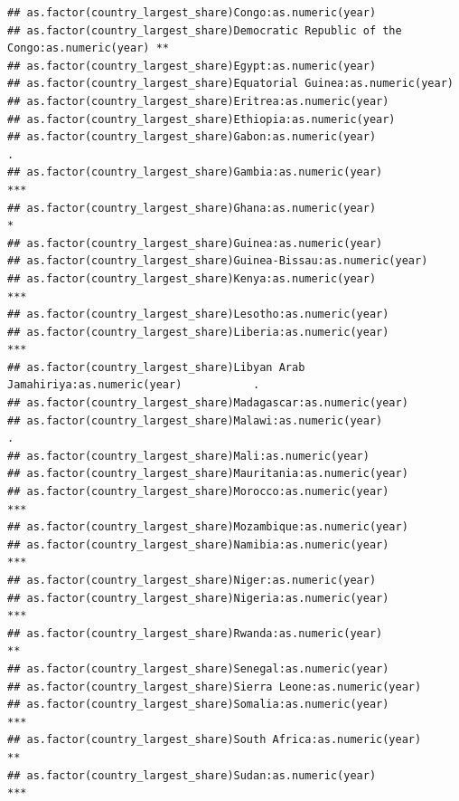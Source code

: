 \documentclass[
  a4paper,
]{article}
\begin{document}
\begin{verbatim}
## as.factor(country_largest_share)Congo:as.numeric(year)                               
## as.factor(country_largest_share)Democratic Republic of the Congo:as.numeric(year) ** 
## as.factor(country_largest_share)Egypt:as.numeric(year)                               
## as.factor(country_largest_share)Equatorial Guinea:as.numeric(year)                   
## as.factor(country_largest_share)Eritrea:as.numeric(year)                             
## as.factor(country_largest_share)Ethiopia:as.numeric(year)                            
## as.factor(country_largest_share)Gabon:as.numeric(year)                            .  
## as.factor(country_largest_share)Gambia:as.numeric(year)                           ***
## as.factor(country_largest_share)Ghana:as.numeric(year)                            *  
## as.factor(country_largest_share)Guinea:as.numeric(year)                              
## as.factor(country_largest_share)Guinea-Bissau:as.numeric(year)                       
## as.factor(country_largest_share)Kenya:as.numeric(year)                            ***
## as.factor(country_largest_share)Lesotho:as.numeric(year)                             
## as.factor(country_largest_share)Liberia:as.numeric(year)                          ***
## as.factor(country_largest_share)Libyan Arab Jamahiriya:as.numeric(year)           .  
## as.factor(country_largest_share)Madagascar:as.numeric(year)                          
## as.factor(country_largest_share)Malawi:as.numeric(year)                           .  
## as.factor(country_largest_share)Mali:as.numeric(year)                                
## as.factor(country_largest_share)Mauritania:as.numeric(year)                          
## as.factor(country_largest_share)Morocco:as.numeric(year)                          ***
## as.factor(country_largest_share)Mozambique:as.numeric(year)                          
## as.factor(country_largest_share)Namibia:as.numeric(year)                          ***
## as.factor(country_largest_share)Niger:as.numeric(year)                               
## as.factor(country_largest_share)Nigeria:as.numeric(year)                          ***
## as.factor(country_largest_share)Rwanda:as.numeric(year)                           ** 
## as.factor(country_largest_share)Senegal:as.numeric(year)                             
## as.factor(country_largest_share)Sierra Leone:as.numeric(year)                        
## as.factor(country_largest_share)Somalia:as.numeric(year)                          ***
## as.factor(country_largest_share)South Africa:as.numeric(year)                     ** 
## as.factor(country_largest_share)Sudan:as.numeric(year)                            ***

\end{verbatim}
\end{document}
